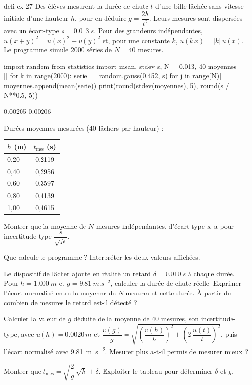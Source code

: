 \begin{blocEdition}{defi-ex-27}
Des élèves mesurent la durée de chute $t$ d'une bille lâchée sans vitesse initiale d'une hauteur $h$, pour en déduire
$g=\dfrac{2h}{t^2}$. Leurs mesures sont dispersées avec un écart-type $s=\qty{0,013}{s}$. Pour des grandeurs indépendantes,
$u(x+y)^2=u(x)^2+u(y)^2$ et, pour une constante $k$, $u(k\,x)=|k|\,u(x)$. Le programme simule \num{2000} séries de $N=40$ mesures.
\begin{codecote}[0.62]
\begin{pythoncol}
import random
from statistics import mean, stdev
s, N = 0.013, 40
moyennes = []
for k in range(2000):
    serie = [random.gauss(0.452, s)
             for j in range(N)]
    moyennes.append(mean(serie))
print(round(stdev(moyennes), 5),
      round(s / N**0.5, 5))
\end{pythoncol}
\cote
\begin{consolecol}
0.00205 0.00206
\end{consolecol}
\par\medskip
\fontsize{9.5}{12.5}\selectfont
Durées moyennes mesurées (40 lâchers par hauteur) :\par\smallskip
\begin{tabular}{@{}lc@{}}
\toprule
$h$ (m) & $t_\mathrm{mes}$ (s) \\
\midrule
0,20 & 0,2119 \\
0,40 & 0,2956 \\
0,60 & 0,3597 \\
0,80 & 0,4139 \\
1,00 & 0,4615 \\
\bottomrule
\end{tabular}
\end{codecote}
\par\smallskip
\begin{questions}
\item Montrer que la moyenne de $N$ mesures indépendantes, d'écart-type $s$, a pour incertitude-type $\dfrac{s}{\sqrt N}$.
\item Que calcule le programme ? Interpréter les deux valeurs affichées.
\item Le dispositif de lâcher ajoute en réalité un retard $\delta=\qty{0,010}{s}$ à chaque durée. Pour $h=\qty{1,000}{m}$ et
$g=\qty{9,81}{m.s^{-2}}$, calculer la durée de chute réelle. Exprimer l'écart normalisé entre la moyenne de $N$ mesures et
cette durée. À partir de combien de mesures le retard est-il détecté ?
\item Calculer la valeur de $g$ déduite de la moyenne de 40 mesures, son incertitude-type, avec $u(h)=\qty{0,0020}{m}$ et
$\dfrac{u(g)}{g}=\sqrt{\left(\dfrac{u(h)}{h}\right)^2+\left(2\,\dfrac{u(t)}{t}\right)^2}$, puis l'écart normalisé avec \qty{9,81}{m.s^{-2}}. Mesurer plus a-t-il permis de
mesurer mieux ?
\item Montrer que $t_\mathrm{mes}=\sqrt{\dfrac{2}{g}}\,\sqrt h+\delta$. Exploiter le tableau pour déterminer $\delta$ et $g$.
\end{questions}
\end{blocEdition}
